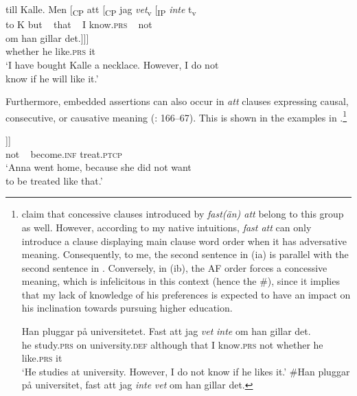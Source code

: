 \documentclass[output=paper,colorlinks,citecolor=brown,draft,draftmode]{langscibook}
\begin{document}
\gll     till    Kalle.  Men [\textsubscript{CP}  att [\textsubscript{CP}  jag  \textit{{vet}}\textsubscript{v} [\textsubscript{IP}    \textit{{inte}} t\textsubscript{v}   \\
    to    K    but   ~ that  ~  I    know.\textsc{prs} ~ not ~ \\
\gll     om      han  gillar      det.]]]  \\
    whether  he    like.\textsc{prs}    it\\
\glt `I have bought Kalle a necklace. However, I do not   \\
    know if he will like it.’
\z
\z


Furthermore, embedded assertions can also occur in \textit{att} clauses expressing causal, consecutive, or causative meaning (\citealt{Julien2015}: 166–67). This is shown in the examples in .\footnote{\citet[467]{TelemanEtAl1999} claim
 that concessive clauses introduced by \textit{fast(än) att} belong to this group as well. However, according to my native intuitions, \textit{fast att} can only introduce a clause displaying main clause word order when it has adversative meaning. Consequently, to me, the second sentence in
 (ia) is parallel with the second sentence in . Conversely, in
 (ib), the AF order forces a concessive meaning, which is infelicitous in this context (hence the \#), since it implies that my lack of knowledge of his preferences is expected to have an impact on his inclination towards pursuing higher education.

    \ea
    \ea
    \gll Han  pluggar    på    universitetet.    Fast      att jag  \textit{vet}  \textit{inte}  om      han  gillar      det.\\
    he    study.\textsc{prs}  on    university.\textsc{def}  although    that    I    know.\textsc{prs}    not    whether  he  like.\textsc{prs}    it \\
    \glt ‘He studies at university. However, I do not know if he likes it.’
    \ex \#Han pluggar på universitet, fast att jag \textit{inte} \textit{vet} om han gillar det.
    \z
    \zlast
} 


\ea\label{ex:petzell:10}

\gll     [\textsubscript{CP}   därför     att [\textsubscript{CP}   så    \textit{{ville}}\textsubscript{v} [\textsubscript{IP} hon   \\
          ~ because  that  ~  so    want.\textsc{pst} ~ she  \\
\gll     \textit{{inte}} t\textsubscript{v}    bli         behandlad.]]]  \\
    not    ~    become.\textsc{inf}    treat.\textsc{ptcp}\\
\glt `Anna went home, because she did not want   \\
    to be treated like that.’
\end{document}
